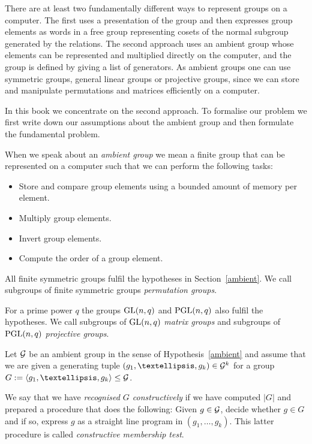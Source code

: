 There are at least two fundamentally different ways to represent groups on
a computer. The first uses a presentation of the group and then
expresses group elements as words in a free group representing
cosets of the normal subgroup generated by the relations. The second
approach uses an ambient group whose elements can be represented and
multiplied directly on the computer, and the group is defined by giving
a list of generators. As ambient groups one can use symmetric groups, general
linear groups or projective groups, since we can store and manipulate
permutations and matrices efficiently on a computer.

In this book we concentrate on the second approach. To formalise our
problem we first write down our assumptions about the ambient group
and then formulate the fundamental problem.

\begin{Hyp}
\label{ambient}
When we speak about an \emph{ambient group} we mean a finite group that can
be represented on a computer such that we can perform the following tasks:
\begin{itemize}
\item Store and compare group elements using a bounded amount of memory
per element.
\item Multiply group elements.
\item Invert group elements.
\item Compute the order of a group element.
\end{itemize}
\end{Hyp}

\begin{Rem}
All finite symmetric groups fulfil the hypotheses in Section~\ref{ambient}.
We call subgroups of finite symmetric groups \emph{permutation groups}.

For a prime power $q$ the groups $\GL(n,q)$ and $\PGL(n,q)$ also fulfil
the hypotheses. We call subgroups of $\GL(n,q)$ \emph{matrix groups}
and subgroups of $\PGL(n,q)$ \emph{projective groups}.
\end{Rem}

\begin{Problem}
\label{ProbCR1}
Let $\mathcal{G}$ be an ambient group in the sense of Hypothesis~\ref{ambient} and 
assume that we are given a generating tuple $(g_1, \ldots, g_k) \in
\GG^k$ for a group
$G := \left< g_1, \ldots, g_k \right> \le \GG$. 

We say that we have \emph{recognised $G$ constructively} if we have 
computed $|G|$ and
prepared a procedure that does the following: Given $g \in \mathcal{G}$,
decide whether $g \in G$ and if so, express $g$ as a straight line program
in $(g_1, \ldots, g_k)$. This latter procedure is called \emph{constructive
membership test}.
\proofend
\end{Problem}


